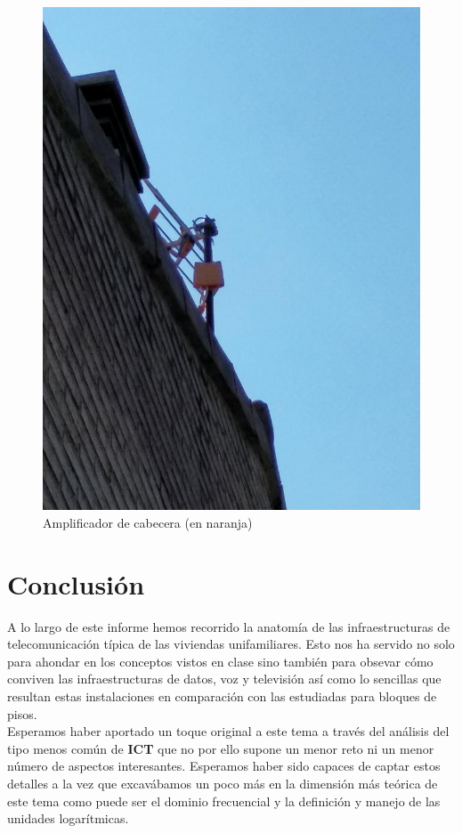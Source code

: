 \documentclass{article}[12 pt]
\begin{document}
			\begin{figure}[hbt!]
				\centering
				\includegraphics[width=0.5\linewidth]{amp_cabecera.jpg}
				\caption{Amplificador de cabecera (en naranja)}
				\label{f:amp_cabecera}
			\end{figure}

	\section{Conclusión}
		A lo largo de este informe hemos recorrido la anatomía de las infraestructuras de telecomunicación típica de las viviendas unifamiliares. Esto nos ha servido no solo para ahondar en los conceptos vistos en clase sino también para obsevar cómo conviven las infraestructuras de datos, voz y televisión así como lo sencillas que resultan estas instalaciones en comparación con las estudiadas para bloques de pisos.\\

		Esperamos haber aportado un toque original a este tema a través del análisis del tipo menos común de \textbf{ICT} que no por ello supone un menor reto ni un menor número de aspectos interesantes. Esperamos haber sido capaces de captar estos detalles a la vez que excavábamos un poco más en la dimensión más teórica de este tema como puede ser el dominio frecuencial y la definición y manejo de las unidades logarítmicas.\\
\end{document}
